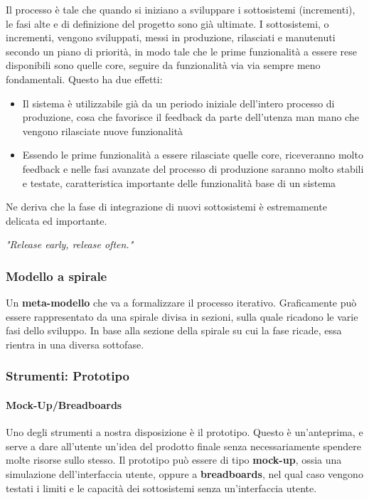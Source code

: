         Il processo è tale che quando si iniziano a sviluppare i sottosistemi (incrementi), le fasi alte e di definizione del progetto sono già ultimate. I sottosistemi, o incrementi, vengono sviluppati, messi in produzione, rilasciati e manutenuti secondo un piano di priorità, in modo tale che le prime funzionalità a essere rese disponibili sono quelle core, seguire da funzionalità via via sempre meno fondamentali. Questo ha due effetti:
        \begin{itemize}
            \item Il sistema è utilizzabile già da un periodo iniziale dell'intero processo di produzione, cosa che favorisce il feedback da parte dell'utenza man mano che vengono rilasciate nuove funzionalità
            \item Essendo le prime funzionalità a essere rilasciate quelle core, riceveranno molto feedback e nelle fasi avanzate del processo di produzione saranno molto stabili e testate, caratteristica importante delle funzionalità base di un sistema
        \end{itemize}
        Ne deriva che la fase di integrazione di nuovi sottosistemi è estremamente delicata ed importante.
        \begin{center}
        {\selectfont\Large
            \textit{"Release early, release often."}
        }
        \end{center}
        
    \subsubsection{Modello a spirale}
        Un \textbf{meta-modello} che va a formalizzare il processo iterativo. Graficamente può essere rappresentato da una spirale divisa in sezioni, sulla quale ricadono le varie fasi dello sviluppo. In base alla sezione della spirale su cui la fase ricade, essa rientra in una diversa sottofase.
    
    \subsubsection{Strumenti: Prototipo}
        \paragraph{Mock-Up/Breadboards} Uno degli strumenti a nostra disposizione è il prototipo. Questo è un'anteprima, e serve a dare all'utente un'idea del prodotto finale senza necessariamente spendere molte risorse sullo stesso. Il prototipo può essere di tipo \textbf{mock-up}, ossia una simulazione dell'interfaccia utente, oppure a \textbf{breadboards}, nel qual caso vengono testati i limiti e le capacità dei sottosistemi senza un'interfaccia utente.
        
